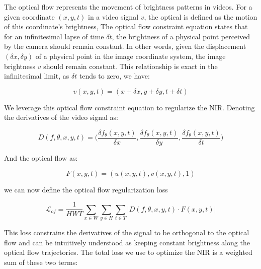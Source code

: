\documentclass{article}
\begin{document}

The optical flow represents the movement of brightness patterns in videos.
For a given coordinate $(x,y,t)$ in a video signal $v$, the optical is defined as the motion of this coordinate's brightness,
The optical flow constraint equation states that for an infinitesimal lapse of time $\delta t$,
the brightness of a physical point perceived by the camera should remain constant.
In other words, given the displacement $(\delta x, \delta y)$ of a physical point in the image coordinate system,
the image brightness $v$ should remain constant.
This relationship is exact in the infinitesimal limit, as  $\delta t$ tends to zero, we have:

\begin{equation}
v(x, y, t)=(x + \delta x, y + \delta y, t + \delta t)
\end{equation}

We leverage this optical flow constraint equation to regularize the NIR.
Denoting the derivatives of the video signal as:

\begin{equation}
D(f, \theta, x, y, t)=\Big(\frac{\delta f_{\theta}(x,y,t)}{\delta x}, \frac{\delta f_{\theta}(x,y,t)}{\delta y}, \frac{\delta f_{\theta}(x,y,t)}{\delta t}\Big)
\end{equation}

And the optical flow as:

\begin{equation}
F(x, y, t)=(u(x,y,t), v(x,y,t), 1)
\end{equation}

we can now define the optical flow regularization loss

\begin{equation}
\mathcal{L}_{of} = \frac{1}{HWT} \sum_{x \in W}\sum_{y \in H}\sum_{t \in T} | D(f, \theta, x, y, t) \cdot F(x, y, t) |
\end{equation}

This loss constrains the derivatives of the signal to be orthogonal to the optical flow and
can be intuitively understood as keeping constant brightness along the optical flow trajectories.
The total loss we use to optimize the NIR is a weighted sum of these two terms:
\end{document}
